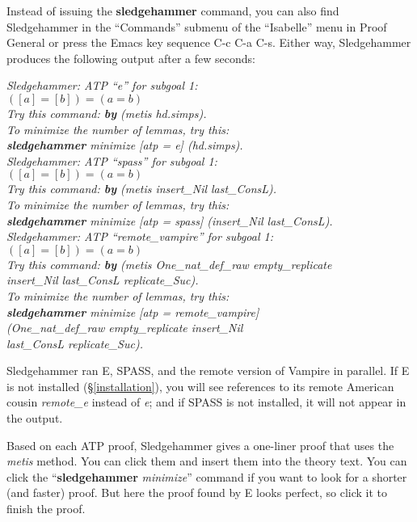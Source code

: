 \documentclass[a4paper,12pt]{article}
\begin{document}
Instead of issuing the \textbf{sledgehammer} command, you can also find
Sledgehammer in the ``Commands'' submenu of the ``Isabelle'' menu in Proof
General or press the Emacs key sequence C-c C-a C-s.
Either way, Sledgehammer produces the following output after a few seconds:

\prew
\slshape
Sledgehammer: ATP ``\textit{e}'' for subgoal 1: \\
$([a] = [b]) = (a = b)$ \\
Try this command: \textbf{by} (\textit{metis hd.simps}). \\
To minimize the number of lemmas, try this: \\
\textbf{sledgehammer} \textit{minimize} [\textit{atp} = \textit{e}] (\textit{hd.simps}). \\[3\smallskipamount]
%
Sledgehammer: ATP ``\textit{spass}'' for subgoal 1: \\
$([a] = [b]) = (a = b)$ \\
Try this command: \textbf{by} (\textit{metis insert\_Nil last\_ConsL}). \\
To minimize the number of lemmas, try this: \\
\textbf{sledgehammer} \textit{minimize} [\textit{atp} = \textit{spass}] (\textit{insert\_Nil last\_ConsL}). \\[3\smallskipamount]
%
Sledgehammer: ATP ``\textit{remote\_vampire}'' for subgoal 1: \\
$([a] = [b]) = (a = b)$ \\
Try this command: \textbf{by} (\textit{metis One\_nat\_def\_raw empty\_replicate} \\
\textit{insert\_Nil last\_ConsL replicate\_Suc}). \\
To minimize the number of lemmas, try this: \\
\textbf{sledgehammer} \textit{minimize} [\textit{atp} = \textit{remote\_vampire}] \\
(\textit{One\_nat\_def\_raw empty\_replicate insert\_Nil} \\
\textit{last\_ConsL replicate\_Suc}).
\postw

Sledgehammer ran E, SPASS, and the remote version of Vampire in parallel. If E
is not installed (\S\ref{installation}), you will see references to
its remote American cousin \textit{remote\_e} instead of
\textit{e}; and if SPASS is not installed, it will not appear in the output.

Based on each ATP proof, Sledgehammer gives a one-liner proof that uses the
\textit{metis} method. You can click them and insert them into the theory text.
You can click the ``\textbf{sledgehammer} \textit{minimize}'' command if you
want to look for a shorter (and faster) proof. But here the proof found by E
looks perfect, so click it to finish the proof.
\end{document}
